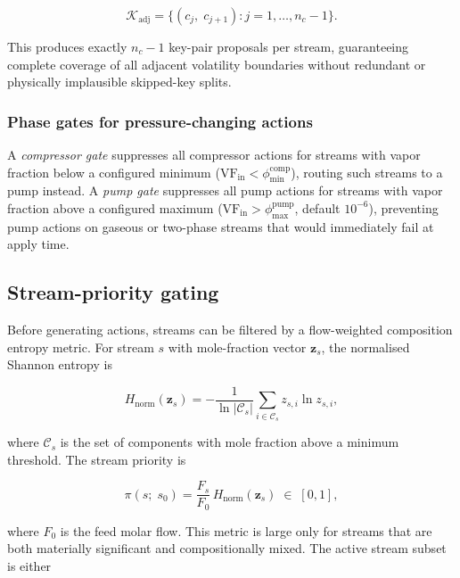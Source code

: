 \documentclass[11pt,a4paper]{article}
\theoremstyle{definition}
\theoremstyle{plain}
\newcommand{\calC}{\mathcal{C}}
\newcommand{\calK}{\mathcal{K}}
\newcommand{\abs}[1]{\left|#1\right|}
\begin{document}
\begin{equation}
 \calK_{\mathrm{adj}} = \{(c_j,\; c_{j+1})
 : j = 1,\ldots,n_c-1\}.
 \label{eq:adj_key_pairs}
\end{equation}

This produces exactly $n_c - 1$ key-pair proposals per stream, guaranteeing complete coverage of all adjacent volatility boundaries without redundant or physically implausible skipped-key splits.

\subsubsection{Phase gates for pressure-changing actions}

A \emph{compressor gate} suppresses all compressor actions for streams with vapor fraction below a configured minimum ($\mathrm{VF}_{\mathrm{in}} < \phi_{\min}^{\mathrm{comp}}$), routing such streams to a pump instead. A \emph{pump gate} suppresses all pump actions for streams with vapor fraction above a configured maximum ($\mathrm{VF}_{\mathrm{in}} > \phi_{\max}^{\mathrm{pump}}$, default $10^{-6}$), preventing pump actions on gaseous or two-phase streams that would immediately fail at apply time.

\subsection{Stream-priority gating}
\label{sec:priority}

Before generating actions, streams can be filtered by a flow-weighted composition entropy metric. For stream $s$ with mole-fraction vector $\bm{z}_s$, the normalised Shannon entropy is

\begin{equation}
 H_{\mathrm{norm}}(\bm{z}_s)
 = -\frac{1}{\ln\abs{\calC_s}}
  \sum_{i \in \calC_s} z_{s,i} \ln z_{s,i},
\end{equation}

where $\calC_s$ is the set of components with mole fraction above a minimum threshold. The stream priority is

\begin{equation}
 \pi(s;\; s_0)
 = \frac{F_s}{F_0}\, H_{\mathrm{norm}}(\bm{z}_s)
 \;\in\; [0,1],
\end{equation}

where $F_0$ is the feed molar flow. This metric is large only for streams that are both materially significant and compositionally mixed. The active stream subset is either
\end{document}
